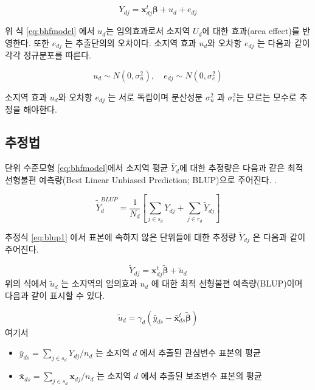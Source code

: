 \documentclass[
]{book}
\newcommand{\bm}[1]{ \symbf{#1}}
\begin{document}
\begin{equation}
Y_{dj} = {\bm x}_{dj}^t \bm \beta + u_d + e_{dj}
\label{eq:bhfmodel}
\end{equation}

위 식 \eqref{eq:bhfmodel} 에서 \(u_d\)는 임의효과로서 소지역 \(U_d\)에 대한 효과(area effect)를 반영한다. 또한 \(e_{dj}\) 는 추출단의의 오차이다. 소지역 효과 \(u_d\)와 오차항 \(e_{dj}\) 는 다음과 같이 각각 정규분포를 따른다.

\begin{equation}
u_d \sim N(0, \sigma^2_u), \quad e_{dj} \sim N(0, \sigma^2_e)
\label{eq:dist}
\end{equation}

소지역 효과 \(u_d\)와 오차항 \(e_{dj}\) 는 서로 독립이며
분산성분 \(\sigma^2_u\) 과 \(\sigma^2_e\)는 모르는 모수로 추정을 해야한다.

\hypertarget{uxcd94uxc815uxbc95}{%
\subsection{추정법}\label{uxcd94uxc815uxbc95}}

단위 수준모형 \eqref{eq:bhfmodel}에서 소지역 평균 \(\bar Y_d\)에 대한 추정량은
다음과 같은 최적 선형불편 예측량(Best Linear Unbiased Prediction; BLUP)으로 주어진다.
\citep{royall1970finite}.

\begin{equation}
\tilde {\bar Y}_d^{BLUP}  = \frac{1}{N_d} \left  [ \sum_{j \in s_d} Y_{dj} 
+ \sum_{j \in r_d} \tilde Y_{dj} \right ] 
\label{eq:blup1}
\end{equation}

추정식 \eqref{eq:blup1} 에서 표본에 속하지 않은 단위들에 대한 추정량 \(\tilde Y_{dj}\) 은 다음과 같이 주어진다.

\[ \tilde Y_{dj} = {\bm x}_{dj}^t \tilde {\bm \beta} + \tilde u_d \]
위의 식에서 \(\tilde u_d\) 는 소지역의 임의효과 \(u_d\) 에 대한 최적 선형불편 예측량(BLUP)이며 다음과 같이 표시할 수 있다.

\[ \tilde u_d = \gamma_d ( \bar y_{ds} - \bar { \bm x}_{ds}^t  \tilde {\bm \beta} ) \]
여기서

\begin{itemize}
\item
  \(\bar y_{ds}= \sum_{j \in s_d} Y_{dj}/ n_d\) 는 소지역 \(d\) 에서 추출된 관심변수 표본의 평균
\item
  \(\bar {\bm x}_{ds}= \sum_{j \in s_d} {\bm x}_{dj}/ n_d\) 는 소지역 \(d\) 에서 추출된 보조변수 표본의 평균
\end{itemize}
\end{document}
